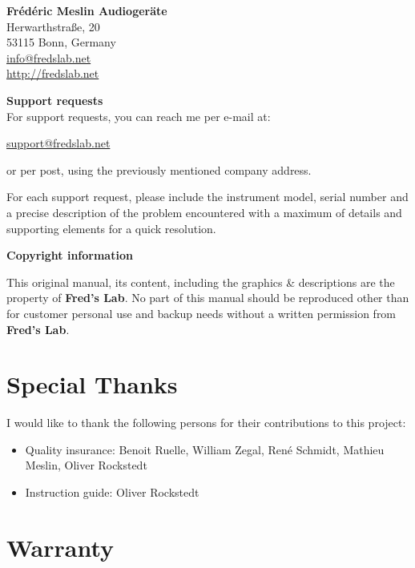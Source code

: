 \documentclass{scrartcl}
\begin{document}
\begin{center}
    \textbf{Frédéric Meslin Audiogeräte} \\
    Herwarthstraße, 20 \\
    53115 Bonn, Germany \\
    \url{info@fredslab.net} \\
    \url{http://fredslab.net} \\
\end{center}

\textbf{Support requests} \\
For support requests, you can reach me per e-mail at:
\begin{center}
    \url{support@fredslab.net}
\end{center}
or per post, using the previously mentioned company address.

For each support request, please include the instrument model, serial number and a precise description of the problem encountered with a maximum of details and supporting elements for a quick resolution.

\textbf{Copyright information}

This original manual, its content, including the graphics \& descriptions are the property of \textbf{Fred's Lab}. No part of this manual should be reproduced other than for customer personal use and backup needs without a written permission from \textbf{Fred's Lab}.

\pagebreak


\section{Special Thanks}

I would like to thank the following persons for their contributions to this project:

\begin{itemize}
    \item Quality insurance: Benoit Ruelle, William Zegal, René Schmidt, Mathieu Meslin, Oliver Rockstedt
    \item Instruction guide: Oliver Rockstedt
\end{itemize}


\section{Warranty}
\end{document}
